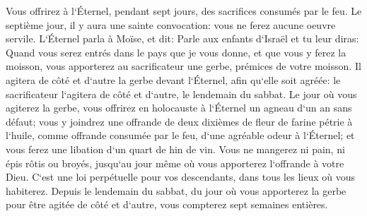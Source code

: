 \verse Vous offrirez à l`Éternel, pendant sept jours, des sacrifices consumés par le feu. Le septième jour, il y aura une sainte convocation: vous ne ferez aucune oeuvre servile. 
\verse L`Éternel parla à Moïse, et dit: 
\verse Parle aux enfants d`Israël et tu leur diras: Quand vous serez entrés dans le pays que je vous donne, et que vous y ferez la moisson, vous apporterez au sacrificateur une gerbe, prémices de votre moisson. 
\verse Il agitera de côté et d`autre la gerbe devant l`Éternel, afin qu`elle soit agréée: le sacrificateur l`agitera de côté et d`autre, le lendemain du sabbat. 
\verse Le jour où vous agiterez la gerbe, vous offrirez en holocauste à l`Éternel un agneau d`un an sans défaut; 
\verse vous y joindrez une offrande de deux dixièmes de fleur de farine pétrie à l`huile, comme offrande consumée par le feu, d`une agréable odeur à l`Éternel; et vous ferez une libation d`un quart de hin de vin. 
\verse Vous ne mangerez ni pain, ni épis rôtis ou broyés, jusqu`au jour même où vous apporterez l`offrande à votre Dieu. C`est une loi perpétuelle pour vos descendants, dans tous les lieux où vous habiterez. 
\verse Depuis le lendemain du sabbat, du jour où vous apporterez la gerbe pour être agitée de côté et d`autre, vous compterez sept semaines entières. 

